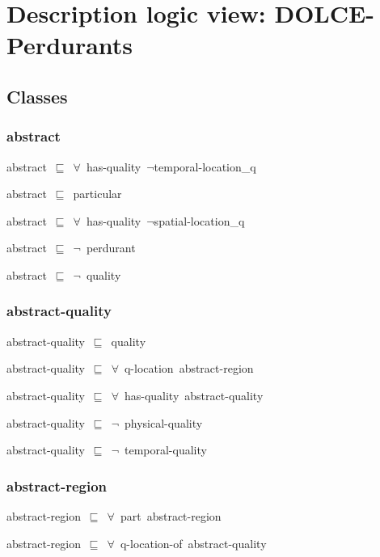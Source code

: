 \documentclass{article}
\begin{document}
\section*{Description logic view: DOLCE-Perdurants}

\subsection*{Classes}

\subsubsection*{abstract}

abstract~\ensuremath{\sqsubseteq}~\ensuremath{\forall}~has-quality~\ensuremath{\lnot}temporal-location\_q~

abstract~\ensuremath{\sqsubseteq}~particular~

abstract~\ensuremath{\sqsubseteq}~\ensuremath{\forall}~has-quality~\ensuremath{\lnot}spatial-location\_q~

abstract~\ensuremath{\sqsubseteq}~\ensuremath{\lnot}~perdurant

abstract~\ensuremath{\sqsubseteq}~\ensuremath{\lnot}~quality

\subsubsection*{abstract-quality}

abstract-quality~\ensuremath{\sqsubseteq}~quality~

abstract-quality~\ensuremath{\sqsubseteq}~\ensuremath{\forall}~q-location~abstract-region~

abstract-quality~\ensuremath{\sqsubseteq}~\ensuremath{\forall}~has-quality~abstract-quality~

abstract-quality~\ensuremath{\sqsubseteq}~\ensuremath{\lnot}~physical-quality

abstract-quality~\ensuremath{\sqsubseteq}~\ensuremath{\lnot}~temporal-quality

\subsubsection*{abstract-region}

abstract-region~\ensuremath{\sqsubseteq}~\ensuremath{\forall}~part~abstract-region~

abstract-region~\ensuremath{\sqsubseteq}~\ensuremath{\forall}~q-location-of~abstract-quality~
\end{document}
